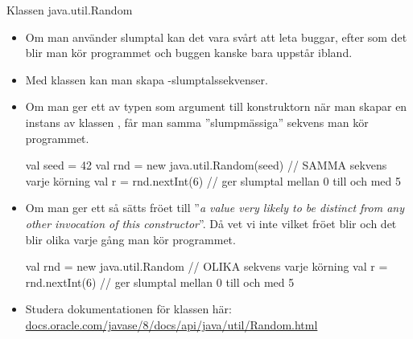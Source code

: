 


\begin{Slide}{Klassen java.util.Random}\SlideFontTiny
\begin{itemize}
\item Om man använder slumptal kan det vara svårt att leta buggar, efter som det blir  man kör programmet och buggen kanske bara uppstår ibland.

\item Med klassen  kan man skapa -slumptalssekvenser.
\pause
\item Om man ger ett   av typen  som argument till konstruktorn när man skapar en instans av klassen , får man samma ''slumpmässiga'' sekvens  man kör programmet.

\begin{Code}
  val seed = 42
  val rnd = new java.util.Random(seed)  // SAMMA sekvens varje körning
  val r = rnd.nextInt(6) // ger slumptal mellan 0 till och med 5
\end{Code}
\pause
\item Om man  ger ett  så sätts fröet till ''\emph{a value very likely to be distinct from any other invocation of this constructor}''. Då vet vi inte vilket fröet blir och det blir olika varje gång man kör programmet.
\begin{Code}
  val rnd = new java.util.Random  // OLIKA sekvens varje körning
  val r = rnd.nextInt(6) // ger slumptal mellan 0 till och med 5
\end{Code}
\pause
\item Studera dokumentationen för klassen  här: \href{https://docs.oracle.com/javase/8/docs/api/java/util/Random.html}{\SlideFontSmall docs.oracle.com/javase/8/docs/api/java/util/Random.html}

\end{itemize}
\end{Slide}

